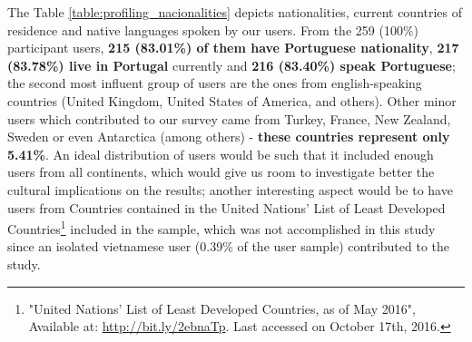 %
The Table \ref{table:profiling_nacionalities} depicts nationalities, current countries of residence and native languages spoken by our users. From the 259 (100\%) participant users,
\textbf{215 (83.01\%) of them have Portuguese nationality}, \textbf{217 (83.78\%) live in Portugal} currently and \textbf{216 (83.40\%) speak Portuguese}; the second most influent group of users are the ones from english-speaking
countries (United Kingdom, United States of America, and others). Other minor users which contributed to our survey came from Turkey, France, New Zealand, Sweden or even Antarctica (among others) -
\textbf{these countries represent only 5.41\%}. An ideal distribution of users would be such that it included enough users from all continents, which would give us room to investigate better the cultural
implications on the results; another interesting aspect would be to have users from Countries contained in the United Nations' List of Least Developed Countries\footnote{"United Nations' List of Least Developed Countries, as of May
2016", Available at: \url{http://bit.ly/2ebnaTp}. Last accessed on October 17th, 2016.} included in the sample, which was not accomplished in this study since an isolated vietnamese
user (0.39\% of the user sample) contributed to the study.
%
